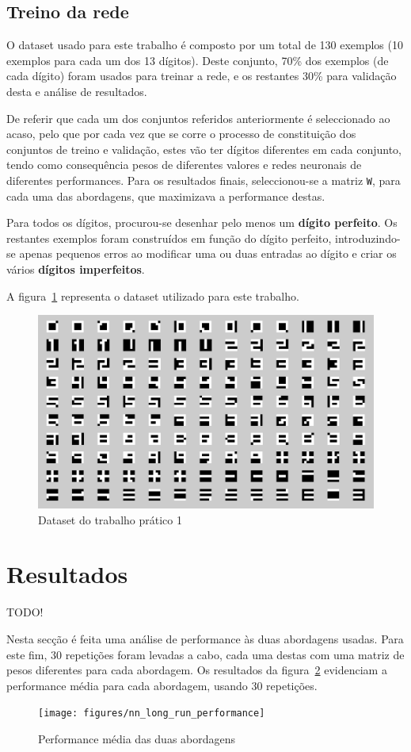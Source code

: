 \documentclass{article}
\newenvironment{text-red}{\color{red}}{}
\begin{document}
\subsection{Treino da rede}
O dataset usado para este trabalho é composto por um total de 130 exemplos (10 exemplos para cada um dos 13 dígitos). Deste conjunto, 70\% dos exemplos (de cada dígito) foram usados para treinar a rede, e os restantes 30\% para validação desta e análise de resultados.

De referir que cada um dos conjuntos referidos anteriormente é seleccionado ao acaso, pelo que por cada vez que se corre o processo de constituição dos conjuntos de treino e validação, estes vão ter dígitos diferentes em cada conjunto, tendo como consequência pesos de diferentes valores e redes neuronais de diferentes performances. Para os resultados finais, seleccionou-se a matriz \texttt{W}, para cada uma das abordagens, que maximizava a performance destas.

Para todos os dígitos, procurou-se desenhar pelo menos um \textbf{dígito perfeito}. Os restantes exemplos foram construídos em função do dígito perfeito, introduzindo-se apenas pequenos erros ao modificar uma ou duas entradas ao dígito e criar os vários \textbf{dígitos imperfeitos}.

A figura~\ref{nn_dataset} representa o dataset utilizado para este trabalho.

\begin{figure}[!h]
  \centering
  \includegraphics[width=5in]{figures/nn_dataset}
  \caption{Dataset do trabalho prático 1}
  \label{nn_dataset}
\end{figure}


\section{Resultados}
\begin{text-red} TODO!\end{text-red}
Nesta secção é feita uma análise de performance às duas abordagens usadas. Para este fim, 30 repetições foram levadas a cabo, cada uma destas com uma matriz de pesos diferentes para cada abordagem. Os resultados da figura~\ref{nn_long_run_performance} evidenciam a performance média para cada abordagem, usando 30 repetições.

\begin{figure}[!h]
  \centering
  \texttt{[image: figures/nn\_long\_run\_performance]}
  \caption{Performance média das duas abordagens}
  \label{nn_long_run_performance}
\end{figure}
\end{document}
